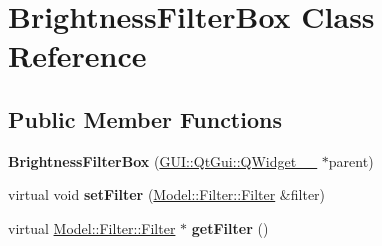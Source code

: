 \hypertarget{classGUI_1_1BrightnessFilterBox}{}\section{Brightness\+Filter\+Box Class Reference}
\label{classGUI_1_1BrightnessFilterBox}
\subsection*{Public Member Functions}
\begin{DoxyCompactItemize}
\item 
\hypertarget{classGUI_1_1BrightnessFilterBox_a37ebb44fb61750578debb2a51d2c00ce}{}{\bfseries Brightness\+Filter\+Box} (\hyperlink{classGUI_1_1QtGui_1_1QWidget____10}{G\+U\+I\+::\+Qt\+Gui\+::\+Q\+Widget\+\_\+\+\_} $\ast$parent)\label{classGUI_1_1BrightnessFilterBox_a37ebb44fb61750578debb2a51d2c00ce}

\item 
\hypertarget{classGUI_1_1BrightnessFilterBox_ad7c0ee00fe3faac7942d75eec2a5342b}{}virtual void {\bfseries set\+Filter} (\hyperlink{classModel_1_1Filter_1_1Filter}{Model\+::\+Filter\+::\+Filter} \&filter)\label{classGUI_1_1BrightnessFilterBox_ad7c0ee00fe3faac7942d75eec2a5342b}

\item 
\hypertarget{classGUI_1_1BrightnessFilterBox_acef2029a93f4ab3a538cdb643b9c2613}{}virtual \hyperlink{classModel_1_1Filter_1_1Filter}{Model\+::\+Filter\+::\+Filter} $\ast$ {\bfseries get\+Filter} ()\label{classGUI_1_1BrightnessFilterBox_acef2029a93f4ab3a538cdb643b9c2613}

\end{DoxyCompactItemize}
